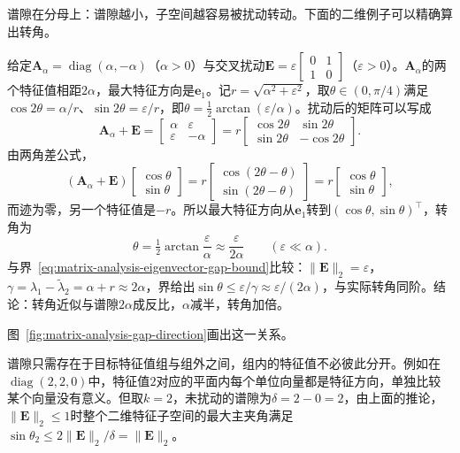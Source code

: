 谱隙在分母上：谱隙越小，子空间越容易被扰动转动。下面的二维例子可以精确算出转角。
\begin{example}[谱隙与特征方向的转角]
\label{ex:ls-gap-direction-rotation}
给定$\bm A_\alpha=\operatorname{diag}(\alpha,-\alpha)$（$\alpha>0$）与交叉扰动$\bm E=\varepsilon\left[\begin{smallmatrix}0&1\\1&0\end{smallmatrix}\right]$（$\varepsilon>0$）。$\bm A_\alpha$的两个特征值相距$2\alpha$，最大特征方向是$\bm e_1$。记$r=\sqrt{\alpha^2+\varepsilon^2}$，取$\theta\in(0,\pi/4)$满足$\cos2\theta=\alpha/r$、$\sin2\theta=\varepsilon/r$，即$\theta=\tfrac12\arctan(\varepsilon/\alpha)$。扰动后的矩阵可以写成
\[
 \bm A_\alpha+\bm E=\begin{bmatrix}\alpha&\varepsilon\\\varepsilon&-\alpha\end{bmatrix}
 =r\begin{bmatrix}\cos2\theta&\sin2\theta\\\sin2\theta&-\cos2\theta\end{bmatrix}.
\]
由两角差公式，
\[
 (\bm A_\alpha+\bm E)\begin{bmatrix}\cos\theta\\\sin\theta\end{bmatrix}
 =r\begin{bmatrix}\cos(2\theta-\theta)\\\sin(2\theta-\theta)\end{bmatrix}
 =r\begin{bmatrix}\cos\theta\\\sin\theta\end{bmatrix},
\]
而迹为零，另一个特征值是$-r$。所以最大特征方向从$\bm e_1$转到$(\cos\theta,\sin\theta)^\top$，转角为
\[
 \theta=\tfrac12\arctan\frac{\varepsilon}{\alpha}\approx\frac{\varepsilon}{2\alpha}\qquad(\varepsilon\ll\alpha).
\]
与界~\eqref{eq:matrix-analysis-eigenvector-gap-bound}比较：$\lVert\bm E\rVert_2=\varepsilon$，$\gamma=\lambda_1-\widetilde\lambda_2=\alpha+r\approx2\alpha$，界给出$\sin\theta\leq\varepsilon/\gamma\approx\varepsilon/(2\alpha)$，与实际转角同阶。结论：转角近似与谱隙$2\alpha$成反比，$\alpha$减半，转角加倍。
\end{example}
图~\ref{fig:matrix-analysis-gap-direction}画出这一关系。

谱隙只需存在于目标特征值组与组外之间，组内的特征值不必彼此分开。例如在$\operatorname{diag}(2,2,0)$中，特征值$2$对应的平面内每个单位向量都是特征方向，单独比较某个向量没有意义。但取$k=2$，未扰动的谱隙为$\delta=2-0=2$，由上面的推论，$\lVert\bm E\rVert_2\leq1$时整个二维特征子空间的最大主夹角满足$\sin\theta_2\leq2\lVert\bm E\rVert_2/\delta=\lVert\bm E\rVert_2$。

